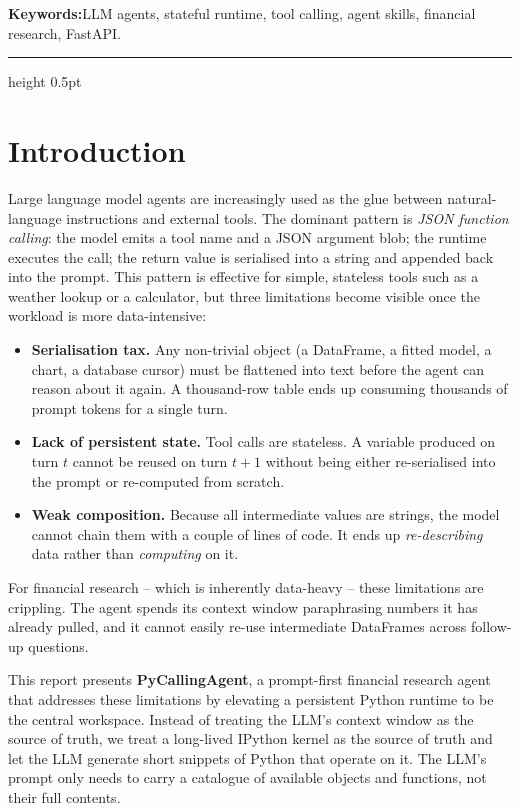 \documentclass[11pt,a4paper]{article}
\begin{document}
\medskip
\noindent\textbf{\color{nusblue}Keywords:}\quad LLM agents, stateful runtime, tool calling, agent skills, financial research, FastAPI.

\vspace{0.6em}
\hrule height 0.5pt
\vspace{1em}

\section{Introduction}

Large language model agents are increasingly used as the glue between natural-language instructions and external tools. The dominant pattern is \emph{JSON function calling}: the model emits a tool name and a JSON argument blob; the runtime executes the call; the return value is serialised into a string and appended back into the prompt. This pattern is effective for simple, stateless tools such as a weather lookup or a calculator, but three limitations become visible once the workload is more data-intensive:

\begin{itemize}[leftmargin=1.3em,itemsep=0.2em]
    \item \textbf{Serialisation tax.} Any non-trivial object (a DataFrame, a fitted model, a chart, a database cursor) must be flattened into text before the agent can reason about it again. A thousand-row table ends up consuming thousands of prompt tokens for a single turn.
    \item \textbf{Lack of persistent state.} Tool calls are stateless. A variable produced on turn $t$ cannot be reused on turn $t{+}1$ without being either re-serialised into the prompt or re-computed from scratch.
    \item \textbf{Weak composition.} Because all intermediate values are strings, the model cannot chain them with a couple of lines of code. It ends up \emph{re-describing} data rather than \emph{computing} on it.
\end{itemize}

For financial research -- which is inherently data-heavy -- these limitations are crippling. The agent spends its context window paraphrasing numbers it has already pulled, and it cannot easily re-use intermediate DataFrames across follow-up questions.

This report presents \textbf{PyCallingAgent}, a prompt-first financial research agent that addresses these limitations by elevating a persistent Python runtime to be the central workspace. Instead of treating the LLM's context window as the source of truth, we treat a long-lived IPython kernel as the source of truth and let the LLM generate short snippets of Python that operate on it. The LLM's prompt only needs to carry a catalogue of available objects and functions, not their full contents.
\end{document}
